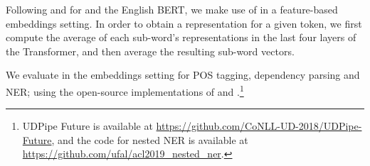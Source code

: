 Following \citet{strakova-etal-2019-neural} and \citet{straka-strakova-2019-evaluating} for \mbert and the English BERT, we make use of \camembert in a feature-based embeddings setting.
In order to obtain a representation for a given token, we first compute the average of each sub-word’s representations in the last four layers of the Transformer, and then average the resulting sub-word vectors.

We evaluate \camembert in the embeddings setting for POS tagging, dependency parsing and NER; using the open-source implementations of  and .\footnote{UDPipe Future is available at \url{https://github.com/CoNLL-UD-2018/UDPipe-Future}, and the code for nested NER is available at \url{https://github.com/ufal/acl2019_nested_ner}.}


